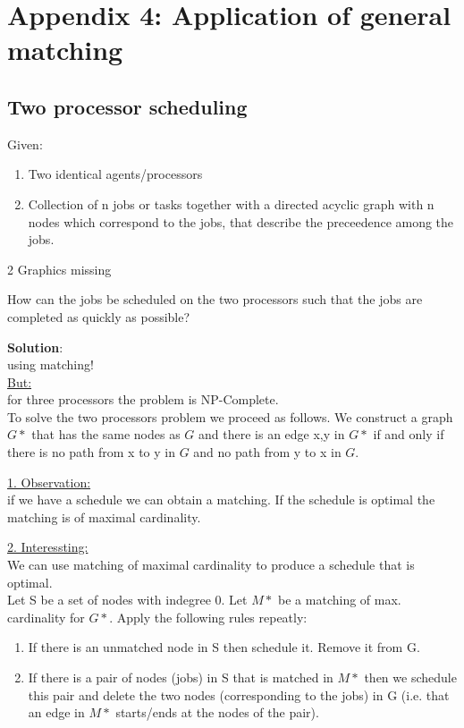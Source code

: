 \setcounter{chapter}{4}
\chapter*{ Appendix 4: Application of general matching}

\section{Two processor scheduling}

Given:\\
\begin{enumerate}
  \item Two identical agents/processors
  \item Collection of n jobs or tasks together with a directed acyclic graph with n nodes which correspond to the jobs, that describe the preceedence among the jobs.
\end{enumerate}


\begin{example}
2 Graphics missing

\end{example}

How can the jobs be scheduled on the two processors such that the jobs are completed as quickly as possible?

\textbf{Solution}:\\
using matching!\\
\underline{But:}\\
for three processors the problem is NP-Complete.\\

To solve the two processors problem we proceed as follows. We construct a graph $G*$ that has the same nodes as $G$ and there is an edge {x,y} in $G*$ if and only if there is no path from x to y in $G$ and no path from y to x in $G$.

\underline{1. Observation:}\\
if we have a schedule we can obtain a matching. If the schedule is optimal the matching is of maximal cardinality.

\underline{2. Interessting:}\\
We can use matching of maximal cardinality to produce a schedule that is optimal.\\

Let S be a set of nodes with indegree 0. Let $M*$ be a matching of max. cardinality for $G*$. Apply the following rules repeatly:\\
\begin{enumerate}
  \item If there is an unmatched node in S then schedule it. Remove it from G.
  \item If there is a pair of nodes (jobs) in S that is matched in $M*$ then we schedule this pair and delete the two nodes (corresponding to the jobs) in G (i.e. that an edge in $M*$ starts/ends at the nodes of the pair).
\end{enumerate}

